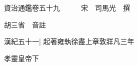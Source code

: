 






























































資治通鑑卷五十九　　　宋　司馬光　撰

胡三省　音註

漢紀五十一|{
	起著雍執徐盡上章敦牂凡三年}


孝靈皇帝下

